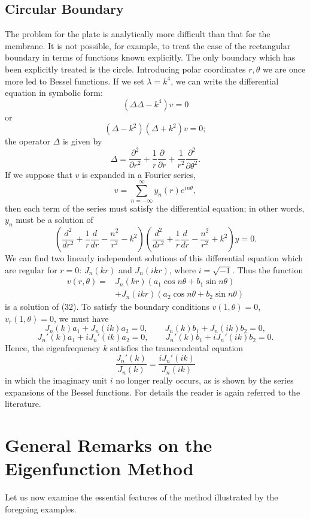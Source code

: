 \subsection{Circular Boundary}
The problem for the plate is analytically more difficult than that for the membrane. It is not possible, for example, to treat the case of the rectangular boundary in terms of functions known explicitly. The only boundary which has been explicitly treated is the circle. Introducing polar coordinates $r,\theta$ we are once more led to Bessel functions. If we set $\lambda=k^4$, we can write the differential equation in symbolic form:
\[
(\Delta\Delta-k^4)v=0
\]
or
\[
(\Delta-k^2)(\Delta+k^2)v=0;
\]
the operator $\Delta$ is given by
\[
\Delta=\frac{\partial^2}{\partial r^2}+\frac1r\frac{\partial}{\partial r}+\frac1{r^2}\frac{\partial^2}{\partial\theta^2}.
\]
If we suppose that $v$ is expanded in a Fourier series,
\[
v=\sum_{n=-\infty}^{\infty}y_n(r)e^{in\theta},
\]
then each term of the series must satisfy the differential equation; in other words, $y_n$ must be a solution of
\[
\left(\frac{d^2}{dr^2}+\frac1r\frac d{dr}-\frac{n^2}{r^2}-k^2\right)
\left(\frac{d^2}{dr^2}+\frac1r\frac d{dr}-\frac{n^2}{r^2}+k^2\right)y=0.
\]
We can find two linearly independent solutions of this differential equation which are regular for $r=0$: $J_n(kr)$ and $J_n(ikr)$, where $i=\sqrt{-1}$. Thus the function
\[
\begin{aligned}
v(r,\theta)={}&J_n(kr)(a_1\cos n\theta+b_1\sin n\theta)\\
&+J_n(ikr)(a_2\cos n\theta+b_2\sin n\theta)
\end{aligned}
\]
is a solution of (32). To satisfy the boundary conditions $v(1,\theta)=0$, $v_r(1,\theta)=0$, we must have
\[
J_n(k)a_1+J_n(ik)a_2=0,
\qquad
J_n(k)b_1+J_n(ik)b_2=0,
\]
\[
J_n'(k)a_1+iJ_n'(ik)a_2=0,
\qquad
J_n'(k)b_1+iJ_n'(ik)b_2=0.
\]
Hence, the eigenfrequency $k$ satisfies the transcendental equation
\[
\frac{J_n'(k)}{J_n(k)}=\frac{iJ_n'(ik)}{J_n(ik)}
\]
in which the imaginary unit $i$ no longer really occurs, as is shown by the series expansions of the Bessel functions. For details the reader is again referred to the literature.

\section{General Remarks on the Eigenfunction Method}
Let us now examine the essential features of the method illustrated by the foregoing examples.

